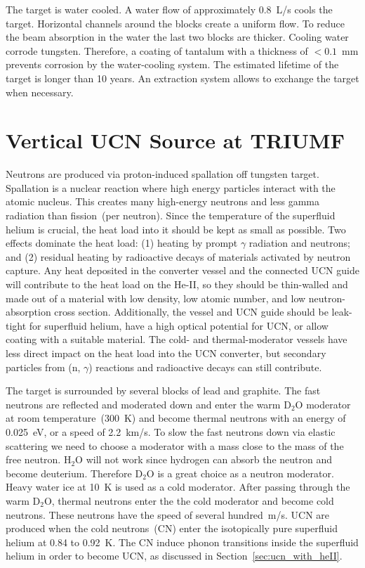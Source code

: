 The target is water cooled. A water flow of approximately
0.8~L/s cools the target. Horizontal channels around the blocks create
a uniform flow. To reduce the beam absorption in the water the last
two blocks are thicker. Cooling water corrode tungsten.  Therefore, a
coating of tantalum with a thickness of $< 0.1$~mm prevents corrosion
by the water-cooling system. The estimated lifetime of the target is
longer than 10 years. An extraction system allows to exchange the
target when necessary.


\section{Vertical UCN Source at TRIUMF\label{sec:vertical_source}}
Neutrons are produced via proton-induced spallation off tungsten
target. Spallation is a nuclear reaction where high energy particles
interact with the atomic nucleus. This creates many high-energy
neutrons and less gamma radiation than fission~(per neutron). Since
the temperature of the superfluid helium is crucial, the heat load
into it should be kept as small as possible. Two effects dominate the
heat load: (1) heating by prompt $\gamma$ radiation and neutrons; and
(2) residual heating by radioactive decays of materials activated by
neutron capture.  Any heat deposited in the converter vessel and the
connected UCN guide will contribute to the heat load on the He-II, so
they should be thin-walled and made out of a material with low
density, low atomic number, and low neutron-absorption cross
section. Additionally, the vessel and UCN guide should be leak-tight
for superfluid helium, have a high optical potential for UCN, or allow
coating with a suitable material. The cold- and thermal-moderator
vessels have less direct impact on the heat load into the UCN
converter, but secondary particles from (n, $\gamma$) reactions and
radioactive decays can still contribute.




The target is surrounded by several blocks of lead and graphite. The
fast neutrons are reflected and moderated down and enter the warm
D$_2$O moderator at room temperature~(300~K) and become thermal
neutrons with an energy of 0.025~eV, or a speed of 2.2~km/s. To slow
the fast neutrons down via elastic scattering we need to choose a
moderator with a mass close to the mass of the free neutron. H$_2$O
will not work since hydrogen can absorb the neutron and become
deuterium. Therefore D$_2$O is a great choice as a neutron moderator.
Heavy water ice at 10~K is used as a cold moderator. After passing
through the warm D$_2$O, thermal neutrons enter the the cold moderator
and become cold neutrons. These neutrons have the speed of several
hundred~m/s. UCN are produced when the cold neutrons~(CN) enter the
isotopically pure superfluid helium at 0.84 to 0.92~K. The CN induce
phonon transitions inside the superfluid helium in order to become
UCN, as discussed in Section~\ref{sec:ucn_with_heII}.





